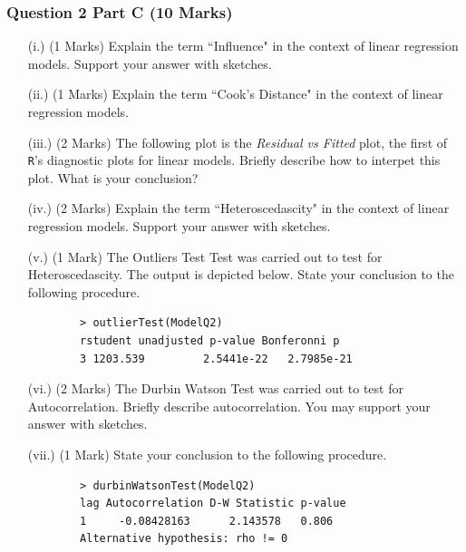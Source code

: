 \documentclass[a4paper,12pt]{article}
\begin{document}
\subsubsection*{Question 2 Part C (10 Marks)}
\begin{itemize}
	\item[(i.)] (1 Marks) Explain the term ``Influence" in the context of linear regression models. Support your answer with sketches.
	\item[(ii.)] (1 Marks) Explain the  term ``Cook's Distance" in the context of linear regression models. 
	\item[(iii.)] (2 Marks) The following plot is the \textit{Residual vs Fitted} plot, the first of \texttt{R}'s diagnostic plots for linear models. Briefly describe how to interpet this plot. What is your conclusion?
	\newpage
	\item[(iv.)] (2 Marks) Explain the term ``Heteroscedascity" in the context of linear regression models. Support your answer with sketches.
	\item[(v.)] (1 Mark) The Outliers Test Test was carried out to test for Heteroscedascity. The output is depicted below. State your conclusion to the following procedure.
	
	\begin{framed}
		\begin{verbatim}
		> outlierTest(ModelQ2)
		rstudent unadjusted p-value Bonferonni p
		3 1203.539         2.5441e-22   2.7985e-21
		\end{verbatim}
	\end{framed}
	
	\item[(vi.)] (2 Marks)  The Durbin Watson Test was carried out to test for Autocorrelation. Briefly describe autocorrelation. You may support your answer with sketches.
	\item[(vii.)] (1 Mark) State your conclusion to the following procedure.
	\begin{framed}
		\begin{verbatim}
		> durbinWatsonTest(ModelQ2)
		lag Autocorrelation D-W Statistic p-value
		1     -0.08428163      2.143578   0.806
		Alternative hypothesis: rho != 0
		\end{verbatim}
	\end{framed}
	
\end{itemize}
\end{document}
